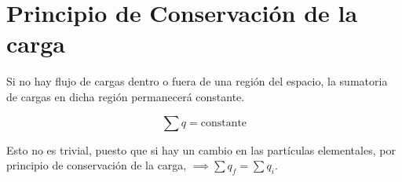 \section{Principio de Conservación de la carga}

Si no hay flujo de cargas dentro o fuera de una región del espacio,
la sumatoria de cargas en dicha región permanecerá constante.

\vspace{.3cm}
\begin{equation}
    \sum q = \text{constante}
\end{equation}
\vspace{.3cm}

Esto no es trivial,
puesto que si hay un cambio en las partículas elementales,
por principio de conservación de la carga,
\(\implies \sum q_f = \sum q_i\).